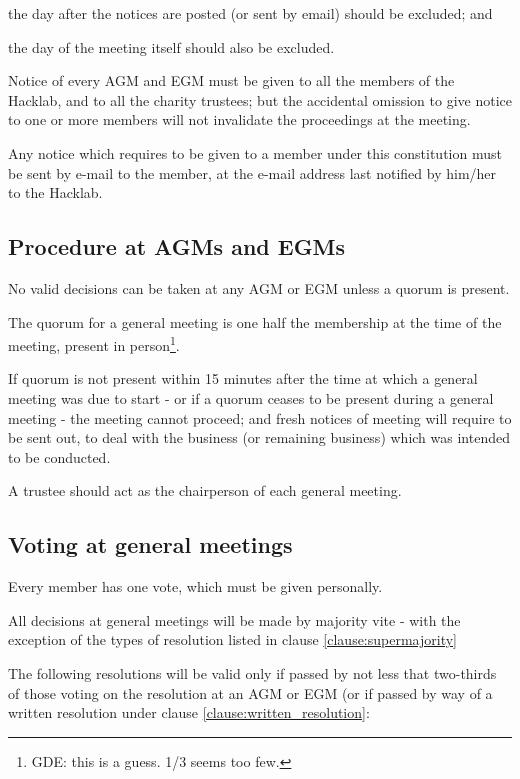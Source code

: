 \documentclass{article}
\begin{document}
\subclause the day after the notices are posted (or sent by email)
should be excluded; and

\subclause the day of the meeting itself should also be excluded.

\clause Notice of every AGM and EGM must be given to all the members
of the Hacklab, and to all the charity trustees; but the accidental
omission to give notice to one or more members will not invalidate the
proceedings at the meeting.

\clause Any notice which requires to be given to a member under this
constitution must be sent by e-mail to the member, at the e-mail
address last notified by him/her to the Hacklab.

\subsection{Procedure at AGMs and EGMs}

\clause No valid decisions can be taken at any AGM or EGM unless a
quorum is present.

\clause The quorum for a general meeting is one half the membership at
the time of the meeting, present in person\footnote{GDE: this is a
  guess. 1/3 seems too few.}.

\clause If quorum is not present within 15 minutes after the time at
which a general meeting was due to start - or if a quorum ceases to be
present during a general meeting - the meeting cannot proceed; and
fresh notices of meeting will require to be sent out, to deal with the
business (or remaining business) which was intended to be conducted.

\clause A trustee should act as the chairperson of each general
meeting.

\subsection{Voting at general meetings}

\clause Every member has one vote, which must be given personally.

\clause All decisions at general meetings will be made by majority
vite - with the exception of the types of resolution listed in clause
\ref{clause:supermajority} 

\clause The following resolutions will be valid only if passed by not
less that two-thirds of those voting on the resolution at an AGM or
EGM (or if passed by way of a written resolution under clause
\ref{clause:written_resolution}:
\end{document}

